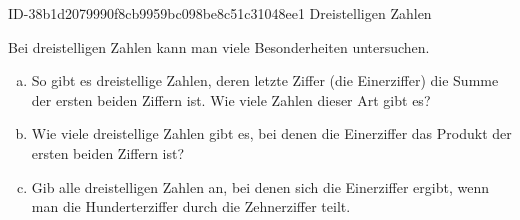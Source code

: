 \begin{exercise}
      {ID-38b1d2079990f8cb9959bc098be8c51c31048ee1}
      {Dreistelligen Zahlen}
  \ifproblem\problem\par
    Bei dreistelligen Zahlen kann man viele Besonderheiten untersuchen.
    \begin{enumerate}[a)]
      \item So gibt es dreistellige Zahlen, deren letzte Ziffer (die Einerziffer)
            die Summe der ersten beiden Ziffern ist. Wie viele Zahlen dieser Art
            gibt es?
      \item Wie viele dreistellige Zahlen gibt es, bei denen die Einerziffer das
            Produkt der ersten beiden Ziffern ist?
      \item Gib alle dreistelligen Zahlen an, bei denen sich die Einerziffer ergibt,
            wenn man die Hunderterziffer durch die Zehnerziffer teilt.
    \end{enumerate}
  \fi
\end{exercise}
